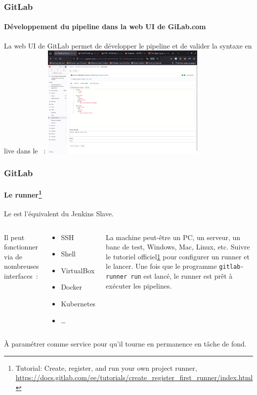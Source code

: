 \documentclass{beamer}
\begin{document}
    \begin{frame}
        \frametitle{GitLab}
        \framesubtitle{Développement du pipeline dans la web UI de GiLab.com}
        \transdissolve
        La web UI de GitLab permet de développer le pipeline et de valider la syntaxe en live dans le ~:
        \bigbreak
        \centering
        \includegraphics[width=8cm]{image/gitlab-pipeline-editor}
    \end{frame}

    \begin{frame}
        \frametitle{GitLab}
        \framesubtitle{Le runner\footnote{\label{configrunner}Tutorial: Create, register, and run your own project runner, \url{https://docs.gitlab.com/ee/tutorials/create\_register\_first\_runner/index.html}}}
        \transdissolve
        Le  est l'équivalent du Jenkins Slave.
        \bigbreak
        \begin{columns}
            Il peut fonctionner via de nombreuses interfaces~:
            \begin{tiny}
                \begin{itemize}
                    \item SSH
                    \item Shell
                    \item VirtualBox
                    \item Docker
                    \item Kubernetes
                    \item \ldots
                \end{itemize}
            \end{tiny}
            La machine peut-être un PC, un serveur, un banc de test, Windows, Mac, Linux, etc.
            \bigbreak
            Suivre le tutoriel officiel\cref{configrunner} pour configurer un runner et le lancer.
            Une fois que le programme \lstinline{gitlab-runner run} est lancé, le runner est prêt à exécuter les pipelines.
        \end{columns}
        \begin{dangercolorbox}
            À paramétrer comme service pour qu'il tourne en permanence en tâche de fond.
        \end{dangercolorbox}
    \end{frame}
\end{document}
